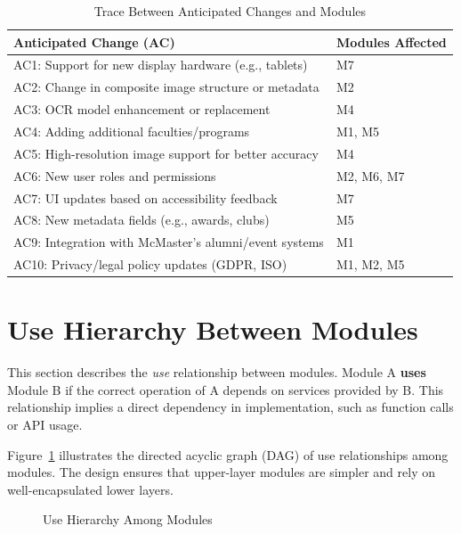 \documentclass[12pt, titlepage]{article}
\begin{document}
\begin{table}[H]
\centering
\caption{Trace Between Anticipated Changes and Modules}
\begin{tabular}{|l|p{10cm}|}
\hline
\textbf{Anticipated Change (AC)} & \textbf{Modules Affected} \\
\hline
AC1: Support for new display hardware (e.g., tablets) & M7 \\
AC2: Change in composite image structure or metadata & M2 \\
AC3: OCR model enhancement or replacement & M4 \\
AC4: Adding additional faculties/programs & M1, M5 \\
AC5: High-resolution image support for better accuracy & M4 \\
AC6: New user roles and permissions & M2, M6, M7 \\
AC7: UI updates based on accessibility feedback & M7 \\
AC8: New metadata fields (e.g., awards, clubs) & M5 \\
AC9: Integration with McMaster's alumni/event systems & M1 \\
AC10: Privacy/legal policy updates (GDPR, ISO) & M1, M2, M5 \\
\hline
\end{tabular}
\end{table}

\section{Use Hierarchy Between Modules}
\label{SecUse}
This section describes the \textit{use} relationship between modules. Module A \textbf{uses} Module B if the correct operation of A depends on services provided by B. This relationship implies a direct dependency in implementation, such as function calls or API usage.

Figure~\ref{fig:usehierarchy} illustrates the directed acyclic graph (DAG) of use relationships among modules. The design ensures that upper-layer modules are simpler and rely on well-encapsulated lower layers.

\begin{figure}[H]
\centering
{}
\caption{Use Hierarchy Among Modules}
\label{fig:usehierarchy}
\end{figure}
\end{document}
